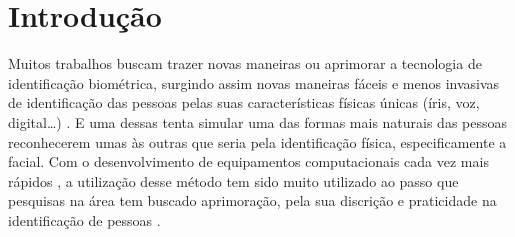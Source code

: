 \section{Introdução}\label{sec:introducao}

Muitos trabalhos buscam trazer novas maneiras ou aprimorar a tecnologia de identificação biométrica, surgindo assim novas maneiras fáceis e menos invasivas de identificação das pessoas pelas suas características físicas únicas (íris, voz, digital…) \cite{refer2}. E uma dessas tenta simular uma das formas mais naturais das pessoas reconhecerem umas às outras que seria pela identificação física, especificamente a facial.
Com o desenvolvimento de equipamentos computacionais cada vez mais rápidos \cite{refer5}, a utilização desse método tem sido muito utilizado ao passo que pesquisas na área tem buscado aprimoração, pela sua discrição e praticidade na identificação de pessoas \cite{refer1}.


